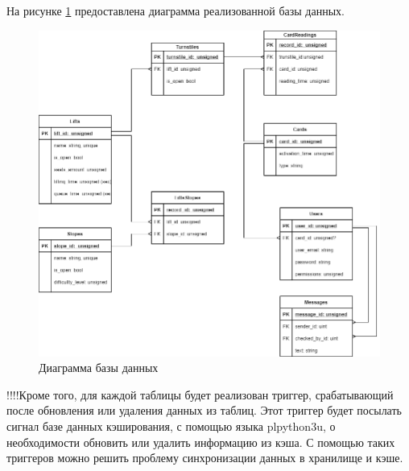 На рисунке \ref{img:db} предоставлена диаграмма реализованной базы данных.



\begin{figure}[h!]
	\begin{center}
		\includegraphics[scale=0.4]{../imgs/db/db.png}
	\end{center}
	\captionsetup{justification=centering}
	\caption{Диаграмма базы данных}
	\label{img:db}
\end{figure}






























!!!!Кроме того, для каждой таблицы будет реализован триггер, срабатывающий после обновления или удаления данных из таблиц. Этот триггер будет посылать сигнал базе данных кэширования, с помощью языка plpython3u, о необходимости обновить или удалить информацию из кэша. С помощью таких триггеров можно решить проблему синхронизации данных в хранилище и кэше.

